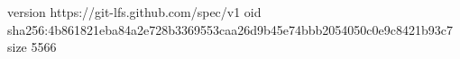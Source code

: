 version https://git-lfs.github.com/spec/v1
oid sha256:4b861821eba84a2e728b3369553caa26d9b45e74bbb2054050c0e9c8421b93c7
size 5566
